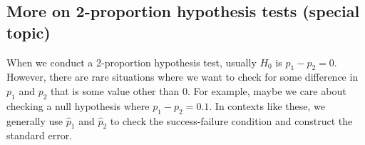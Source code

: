 


\D{\newpage}

\subsection{More on 2-proportion hypothesis tests (special topic)}

When we conduct a 2-proportion hypothesis test,
usually $H_0$ is $p_1 - p_2 = 0$. However, there are rare
situations where we want to check for some difference in
$p_1$ and $p_2$ that is some value other than 0.
For example, maybe we care about checking a null hypothesis
where $p_1 - p_2 = 0.1$. %
In contexts like these, we generally use $\hat{p}_1$ and
$\hat{p}_2$ to check the success-failure condition and
construct the standard error.


